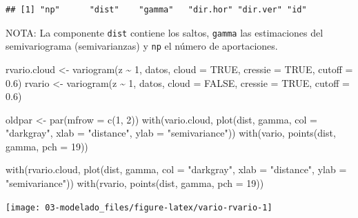 \documentclass[
  spanish,
]{book}
\newenvironment{Shaded}{\begin{snugshade}}{\end{snugshade}}
\newcommand{\AttributeTok}[1]{\textcolor[rgb]{0.77,0.63,0.00}{#1}}
\newcommand{\ConstantTok}[1]{\textcolor[rgb]{0.00,0.00,0.00}{#1}}
\newcommand{\DecValTok}[1]{\textcolor[rgb]{0.00,0.00,0.81}{#1}}
\newcommand{\FloatTok}[1]{\textcolor[rgb]{0.00,0.00,0.81}{#1}}
\newcommand{\FunctionTok}[1]{\textcolor[rgb]{0.00,0.00,0.00}{#1}}
\newcommand{\NormalTok}[1]{#1}
\newcommand{\OtherTok}[1]{\textcolor[rgb]{0.56,0.35,0.01}{#1}}
\newcommand{\SpecialCharTok}[1]{\textcolor[rgb]{0.00,0.00,0.00}{#1}}
\newcommand{\StringTok}[1]{\textcolor[rgb]{0.31,0.60,0.02}{#1}}
\theoremstyle{break}
\begin{document}
\begin{verbatim}
## [1] "np"      "dist"    "gamma"   "dir.hor" "dir.ver" "id"
\end{verbatim}

NOTA: La componente \texttt{dist} contiene los saltos, \texttt{gamma} las estimaciones del semivariograma (semivarianzas) y \texttt{np} el número de aportaciones.

\begin{Shaded}
\begin{Highlighting}[]
\NormalTok{rvario.cloud }\OtherTok{\textless{}{-}} \FunctionTok{variogram}\NormalTok{(z }\SpecialCharTok{\textasciitilde{}} \DecValTok{1}\NormalTok{, datos, }\AttributeTok{cloud =} \ConstantTok{TRUE}\NormalTok{, }\AttributeTok{cressie =} \ConstantTok{TRUE}\NormalTok{, }\AttributeTok{cutoff =} \FloatTok{0.6}\NormalTok{)}
\NormalTok{rvario }\OtherTok{\textless{}{-}} \FunctionTok{variogram}\NormalTok{(z }\SpecialCharTok{\textasciitilde{}} \DecValTok{1}\NormalTok{, datos, }\AttributeTok{cloud =} \ConstantTok{FALSE}\NormalTok{, }\AttributeTok{cressie =} \ConstantTok{TRUE}\NormalTok{, }\AttributeTok{cutoff =} \FloatTok{0.6}\NormalTok{)}

\NormalTok{oldpar }\OtherTok{\textless{}{-}} \FunctionTok{par}\NormalTok{(}\AttributeTok{mfrow =} \FunctionTok{c}\NormalTok{(}\DecValTok{1}\NormalTok{, }\DecValTok{2}\NormalTok{))}
\FunctionTok{with}\NormalTok{(vario.cloud,  }\FunctionTok{plot}\NormalTok{(dist, gamma, }\AttributeTok{col =} \StringTok{"darkgray"}\NormalTok{, }
                        \AttributeTok{xlab =} \StringTok{"distance"}\NormalTok{, }\AttributeTok{ylab =}  \StringTok{"semivariance"}\NormalTok{))}
\FunctionTok{with}\NormalTok{(vario, }\FunctionTok{points}\NormalTok{(dist, gamma, }\AttributeTok{pch =} \DecValTok{19}\NormalTok{))}

\FunctionTok{with}\NormalTok{(rvario.cloud,  }\FunctionTok{plot}\NormalTok{(dist, gamma, }\AttributeTok{col =} \StringTok{"darkgray"}\NormalTok{, }
                        \AttributeTok{xlab =} \StringTok{"distance"}\NormalTok{, }\AttributeTok{ylab =}  \StringTok{"semivariance"}\NormalTok{))}
\FunctionTok{with}\NormalTok{(rvario, }\FunctionTok{points}\NormalTok{(dist, gamma, }\AttributeTok{pch =} \DecValTok{19}\NormalTok{))}
\end{Highlighting}
\end{Shaded}

\begin{center}\texttt{[image: 03-modelado\_files/figure-latex/vario-rvario-1]} \end{center}
\end{document}
